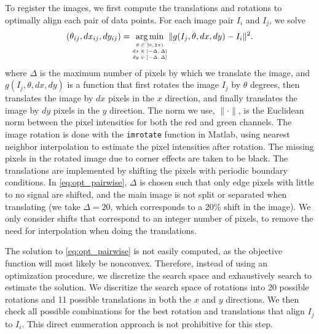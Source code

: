 \documentclass{pnastwo}
\DeclareMathOperator*{\argmin}{arg\,min}
\begin{document}
\begin{article}
\begin{materials}
To register the images, we first compute the translations and rotations to optimally align each pair of data points. 
%
For each image pair $I_i$ and $I_j$, we solve
\begin{equation}\label{eq:opt_pairwise}
(\theta_{ij}, dx_{ij}, dy_{ij}) = \argmin_{
\scriptsize \begin{matrix}
\theta \in [0, 2\pi) \\ 
dx \in [-\Delta, \Delta]\\ 
dy \in [-\Delta, \Delta]
\end{matrix}
} \|g(I_j, \theta, dx, dy) - I_i \|^2.
\end{equation}
where $\Delta$ is the maximum number of pixels by which we translate the image, and $g(I_j, \theta, dx, dy)$ is a function that first rotates the image $I_j$ by $\theta$ degrees, then translates the image by $dx$ pixels in the $x$ direction, and finally translates the image by $dy$ pixels in the $y$ direction. 
%
The norm we use, $\| \cdot \|$, is the Euclidean norm between the pixel intensities for both the red and green channels.
%
The image rotation is done with the \texttt{imrotate} function in Matlab, using nearest neighbor interpolation to estimate the pixel intensities after rotation.%
%
The missing pixels in the rotated image due to corner effects are taken to be black.
%
The translations are implemented by shifting the pixels with periodic boundary conditions.
%
In \eqref{eq:opt_pairwise}, $\Delta$ is chosen such that only edge pixels with little to no signal are shifted, and the main image is not split or separated when translating (we take $\Delta=20$, which corresponds to a 20\% shift in the image).
%
We only consider shifts that correspond to an integer number of pixels, to remove the need for interpolation when doing the translations.  

The solution to \eqref{eq:opt_pairwise} is not easily computed, as the objective function will most likely be nonconvex.
%
Therefore, instead of using an optimization procedure, we discretize the search space and exhaustively search to estimate the solution.
%
We discritize the search space of rotations into 20 possible rotations %
and 11 possible translations in both the $x$ and $y$ directions. %
%
We then check all possible combinations for the best rotation and translations that align $I_j$ to $I_i$. 
%
This direct enumeration approach is not prohibitive for this step.
%
%
%


\end{materials}
\end{article}
\end{document}
